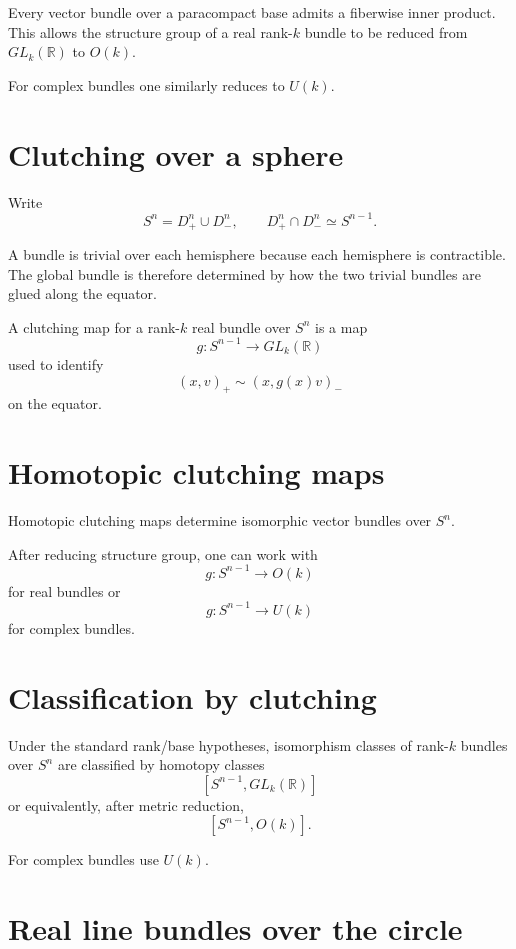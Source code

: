 Every vector bundle over a paracompact base admits a fiberwise inner product.
This allows the structure group of a real rank-\(k\) bundle to be reduced from
\(GL_k(\mathbb R)\) to \(O(k)\).

For complex bundles one similarly reduces to \(U(k)\).

\section{Clutching over a sphere}

Write
\[
S^n=D^n_+\cup D^n_-,
\qquad
D^n_+\cap D^n_-\simeq S^{n-1}.
\]

A bundle is trivial over each hemisphere because each hemisphere is
contractible.  The global bundle is therefore determined by how the two
trivial bundles are glued along the equator.

\begin{definition}
\label{def:viii30-clutching}
A clutching map for a rank-\(k\) real bundle over \(S^n\) is a map
\[
g:S^{n-1}\to GL_k(\mathbb R)
\]
used to identify
\[
(x,v)_+\sim(x,g(x)v)_-
\]
on the equator.
\end{definition}

\section{Homotopic clutching maps}

\begin{theorem}
\label{thm:viii30-clutching-homotopy}
Homotopic clutching maps determine isomorphic vector bundles over \(S^n\).
\end{theorem}

After reducing structure group, one can work with
\[
g:S^{n-1}\to O(k)
\]
for real bundles or
\[
g:S^{n-1}\to U(k)
\]
for complex bundles.

\section{Classification by clutching}

Under the standard rank/base hypotheses, isomorphism classes of rank-\(k\)
bundles over \(S^n\) are classified by homotopy classes
\[
[S^{n-1},GL_k(\mathbb R)]
\]
or equivalently, after metric reduction,
\[
[S^{n-1},O(k)].
\]

For complex bundles use \(U(k)\).

\section{Real line bundles over the circle}


